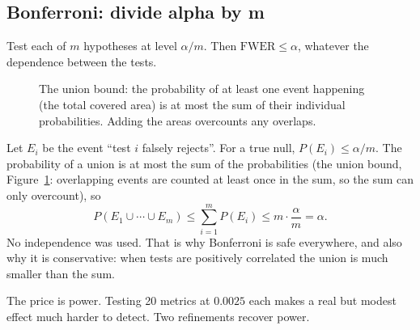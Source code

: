 \subsection{Bonferroni: divide alpha by m}

\begin{theorem}
Test each of $m$ hypotheses at level $\alpha/m$. Then $\mathrm{FWER}\le\alpha$,
whatever the dependence between the tests.
\end{theorem}

\begin{figure}[H]
\centering
{}
\caption{The union bound: the probability of at least one event happening (the total covered area) is at most the sum of their individual probabilities. Adding the areas overcounts any overlaps.}
\label{fig:pitfalls-unionbound}
\end{figure}

\begin{whybox}
Let $E_i$ be the event ``test $i$ falsely rejects''. For a true null,
$P(E_i)\le\alpha/m$. The probability of a union is at most the sum of the
probabilities (the union bound, Figure~\ref{fig:pitfalls-unionbound}: overlapping events are counted at least once in
the sum, so the sum can only overcount), so
\[
  P(E_1\cup\cdots\cup E_m)\le \sum_{i=1}^m P(E_i)\le m\cdot\frac{\alpha}{m}=\alpha.
\]
No independence was used. That is why Bonferroni is safe everywhere, and also
why it is conservative: when tests are positively correlated the union is much
smaller than the sum.
\end{whybox}

The price is power. Testing 20 metrics at $0.0025$ each makes a real but modest
effect much harder to detect. Two refinements recover power.

